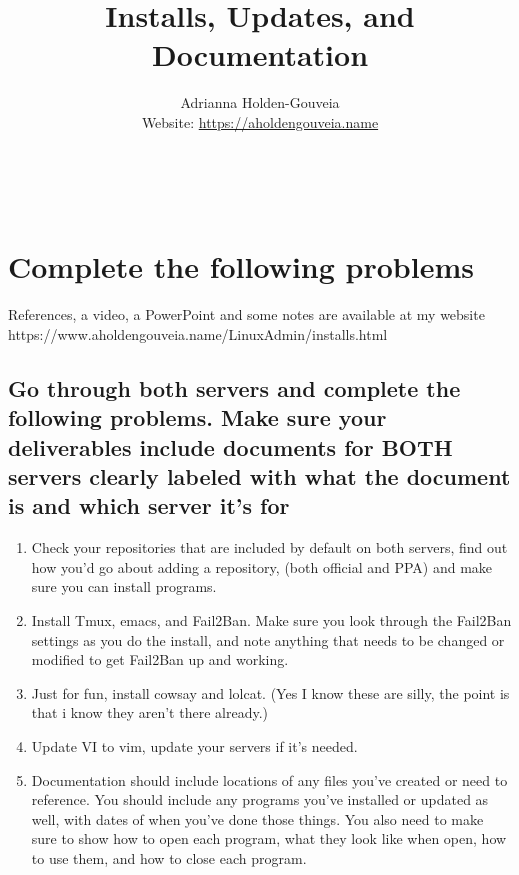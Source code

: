 \documentclass[12pt]{article}
\title{Installs, Updates, and Documentation}
\author{
        Adrianna Holden-Gouveia \\
        Website: \url{https://aholdengouveia.name}\\ 
        \date{\vspace{-5ex}}
        \faLinkedin{: aholdengouveia} \\
        \faGithub {: aholdengouveia} \\
        }
\begin{document}
    

\maketitle


\section*{Complete the following problems}

References, a video, a PowerPoint and some notes are available at my website
https://www.aholdengouveia.name/LinuxAdmin/installs.html



\subsection*{Go through both servers and complete the following problems.  Make sure your deliverables include documents for BOTH servers clearly labeled with what the document is and which server it's for}
    \begin{enumerate}
        \item Check your repositories that are included by default on both servers, find out how you'd go about adding a repository, (both official and PPA) and make sure you can install programs.
        \item Install Tmux, emacs, and Fail2Ban.  Make sure you look through the Fail2Ban settings as you do the install, and note anything that needs to be changed or modified to get Fail2Ban up and working.
        \item Just for fun, install cowsay and lolcat.   (Yes I know these are silly, the point is that i know they aren't there already.)
        \item Update VI to vim, update your servers if it's needed.
        \item Documentation should include locations of any files you've created or need to reference. You should include any programs you've installed or updated as well, with dates of when you've done those things. You also need to make sure to show how to open each program, what they look like when open, how to use them, and how to close each program.
    \end{enumerate}
\end{document}
